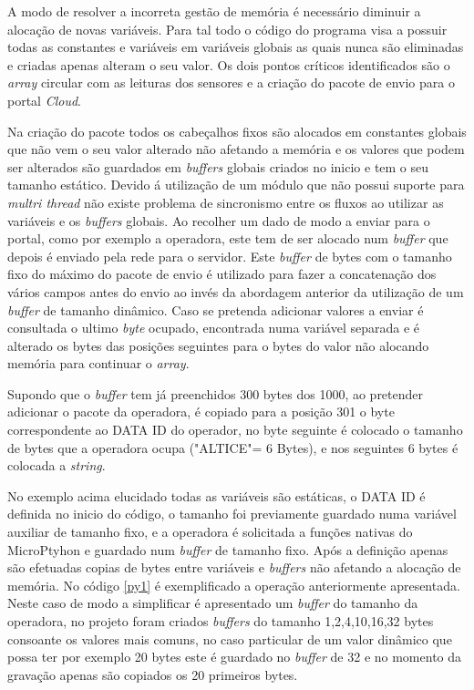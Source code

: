 \par A modo de resolver a incorreta gestão de memória é necessário diminuir a alocação de novas variáveis. Para tal todo o código do programa visa a possuir todas as constantes e variáveis em variáveis globais as quais nunca são eliminadas e criadas apenas alteram o seu valor. Os dois pontos críticos identificados são o \textit{array } circular com as leituras dos sensores e a criação do pacote de envio para o portal \textit{Cloud}.
\par Na criação do pacote todos os cabeçalhos fixos são alocados em constantes globais que não vem o seu valor alterado não afetando a memória e os valores que podem ser alterados são guardados em \textit{buffers} globais criados no inicio e tem o seu tamanho estático. Devido á utilização de um módulo que não possui suporte para \textit{multri thread} não existe problema de sincronismo entre os fluxos ao utilizar as variáveis e os \textit{buffers} globais. Ao recolher um dado de modo a enviar para o portal, como por exemplo a operadora, este tem de ser alocado num \textit{buffer} que depois é enviado pela rede para o servidor. Este \textit{buffer} de bytes com o tamanho fixo do máximo do pacote de envio é utilizado para fazer a concatenação dos vários campos antes do envio ao invés da abordagem anterior da utilização de um \textit{buffer} de tamanho dinâmico. Caso se pretenda adicionar valores a enviar é consultada o ultimo \textit{byte} ocupado, encontrada numa variável separada e é alterado os bytes das posições seguintes para o bytes do valor não alocando memória para continuar o \textit{array}.
\par Supondo que o \textit{buffer} tem já preenchidos 300 bytes dos 1000, ao pretender adicionar o pacote da operadora, é copiado para a posição 301 o byte correspondente ao DATA ID do operador, no byte seguinte é colocado o tamanho de bytes que a operadora ocupa ("ALTICE"= 6 Bytes), e nos seguintes 6 bytes é colocada a \textit{string}.
\par No exemplo acima elucidado todas as variáveis são estáticas, o DATA ID é definida no inicio do código, o tamanho foi previamente guardado numa variável auxiliar de tamanho fixo, e a operadora é solicitada a funções nativas do MicroPtyhon e guardado num \textit{buffer} de tamanho fixo. Após a definição apenas são efetuadas copias de bytes entre variáveis e \textit{buffers} não afetando a alocação de memória. No código \ref{py1} é exemplificado a operação anteriormente apresentada. Neste caso de modo a simplificar é apresentado um \textit{buffer} do tamanho da operadora, no projeto foram criados \textit{buffers} do tamanho 1,2,4,10,16,32 bytes consoante os valores mais comuns, no caso particular de um valor dinâmico que possa ter por exemplo 20 bytes este é guardado no \textit{buffer} de 32 e no momento da gravação apenas são copiados os 20 primeiros bytes.

